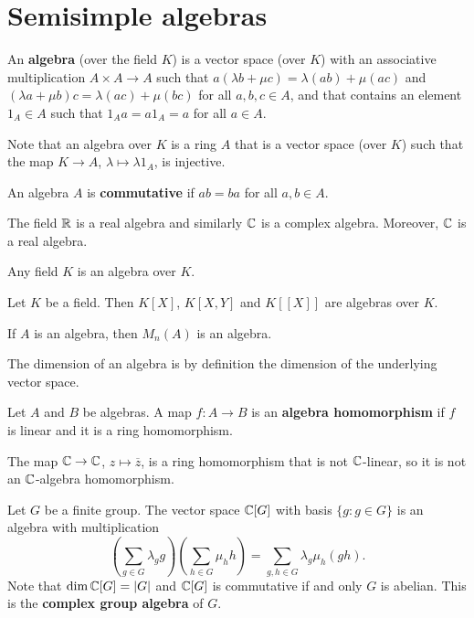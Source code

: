 \chapter{Semisimple algebras}

\begin{definition}
	An \textbf{algebra} (over the field $K$) is a vector space (over $K$) 
	with an associative multiplication $A\times A\to A$ such that
	$a(\lambda b+\mu c)=\lambda(ab)+\mu(ac)$ and
	$(\lambda a+\mu b)c=\lambda(ac)+\mu (bc)$ for all $a,b,c\in A$, and 
	that contains an element $1_A\in A$ such that $1_Aa=a1_A=a$ for all $a\in A$.   
\end{definition}

Note that an algebra over $K$ is a ring $A$ that is a vector space
(over $K$) such that the map $K\to A$, $\lambda\mapsto \lambda1_A$, is injective. 

\begin{definition}
	An algebra $A$ is \textbf{commutative} if $ab=ba$ for all $a,b\in A$. 
\end{definition}

\begin{example}
	The field $\mathbb{R}$ is a real algebra and similarly 
	$\mathbb{C}$ is a complex algebra. Moreover, $\mathbb{C}$ is a real algebra. 
\end{example}

Any field $K$ is an algebra over $K$.

\begin{example}
	Let $K$ be a field. Then $K[X]$, $K[X,Y]$ and $K[[X]]$ are algebras over $K$.
\end{example}

\begin{example}
	If $A$ is an algebra, then $M_n(A)$ is an algebra. 	
\end{example}

The dimension of an algebra is by 
definition the dimension of the 
underlying vector space. 

\begin{definition}
	Let $A$ and $B$ be algebras. A map $f\colon A\to B$ is an \textbf{algebra homomorphism} 
	if $f$ is linear and it is a ring homomorphism.  	
\end{definition}

The map $\mathbb{C}\to\mathbb{C}$, $z\mapsto\overline{z}$, is a ring homomorphism that
is not $\mathbb{C}$-linear, so it is not an $\mathbb{C}$-algebra homomorphism. 

\begin{example}
	Let $G$ be a finite group. The vector space 
	$\mathbb{C}[G]$ with basis $\{g:g\in G\}$
	is an algebra with multiplication
	\[
	\left(\sum_{g\in G}\lambda_gg\right)\left(\sum_{h\in G}\mu_hh\right)
	=\sum_{g,h\in G}\lambda_g\mu_h(gh).
	\] 	
	Note that $\dim\mathbb{C}[G]=|G|$ and
	$\mathbb{C}[G]$ is commutative if and only $G$ is abelian. 
	This is the \textbf{complex group algebra} of $G$. 
\end{example}

